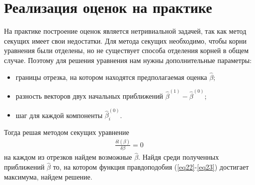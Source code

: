 \documentclass[a4paper,14pt]{extarticle}
\begin{document}
\section{Реализация оценок на практике}
На практике построение оценок является нетривиальной задачей, так как метод секущих имеет свои недостатки.
Для метода секущих необходимо, чтобы корни уравнения были отделены, но не существует способа отделения корней в общем случае.
Поэтому для решения уравнения нам нужны дополнительные параметры:
\begin{itemize}
    \item границы отрезка, на котором находятся предполагаемая оценка $\hat{\beta}$;
    \item разность векторов двух начальных приближений $\hat{\beta}^{(1)} - \hat{\beta}^{(0)}$;
    \item шаг для каждой компоненты $\hat{\beta}_i^{(0)}$.
\end{itemize}
Тогда решая методом секущих уравнение
\begin{eqnarray}
    \frac{\delta l (\beta)}{\delta \beta}=0
\end{eqnarray}
на каждом из отрезков найдем возможные $\hat{\beta}$. Найдя среди полученных приближений $\hat{\beta}$ то, 
на котором функция правдоподобия (\ref{eq22}-\ref{eq23}) достигает максимума, 
найдем решение.
\end{document}
